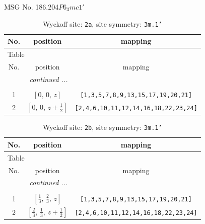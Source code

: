\documentclass[fleqn,8pt]{jsarticle}
\begin{document}
\setcounter{MaxMatrixCols}{32}

\renewcommand{\tablename}{Table~}
\renewcommand{\figurename}{Figure~}
\begin{center}
\LARGE
MSG No. 186.204\quad$P6_{3}mc1'$
\end{center}
\renewcommand{\arraystretch}{1.2}
\begin{longtable}{ccc}
\caption{Wyckoff site: {\tt 2a}, site symmetry: {\tt 3m.1'}}
 \\
 \hline \hline
No. & position & mapping \\ \hline \endfirsthead

\multicolumn{2}{l}{\tablename\ \thetable{}} \\
 \hline \hline
No. & position & mapping \\ \hline \endhead

 \hline \hline
\multicolumn{2}{r}{\footnotesize\it continued ...} \\ \endfoot

 \hline \hline
\multicolumn{2}{r}{} \\ \endlastfoot

1 & $\left[ 0,\, 0,\, z \right]$ & {\tt [1,3,5,7,8,9,13,15,17,19,20,21]} \\ \hline
2 & $\left[ 0,\, 0,\, z + \frac{1}{2} \right]$ & {\tt [2,4,6,10,11,12,14,16,18,22,23,24]} \\
\end{longtable}
\renewcommand{\arraystretch}{1.2}
\begin{longtable}{ccc}
\caption{Wyckoff site: {\tt 2b}, site symmetry: {\tt 3m.1'}}
 \\
 \hline \hline
No. & position & mapping \\ \hline \endfirsthead

\multicolumn{2}{l}{\tablename\ \thetable{}} \\
 \hline \hline
No. & position & mapping \\ \hline \endhead

 \hline \hline
\multicolumn{2}{r}{\footnotesize\it continued ...} \\ \endfoot

 \hline \hline
\multicolumn{2}{r}{} \\ \endlastfoot

1 & $\left[ \frac{1}{3},\, \frac{2}{3},\, z \right]$ & {\tt [1,3,5,7,8,9,13,15,17,19,20,21]} \\ \hline
2 & $\left[ \frac{2}{3},\, \frac{1}{3},\, z + \frac{1}{2} \right]$ & {\tt [2,4,6,10,11,12,14,16,18,22,23,24]} \\
\end{longtable}
\end{document}
